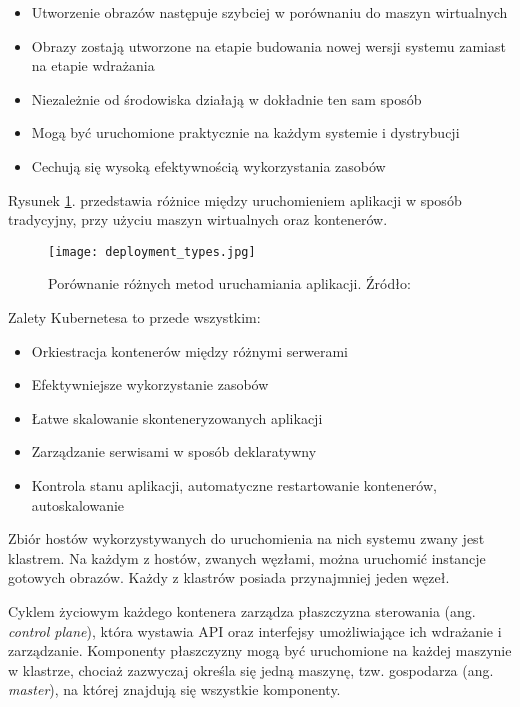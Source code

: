 \begin{itemize} %
    \item Utworzenie obrazów następuje szybciej w porównaniu do maszyn wirtualnych
    \item Obrazy zostają utworzone na etapie budowania nowej wersji systemu zamiast na etapie wdrażania
    \item Niezależnie od środowiska działają w dokładnie ten sam sposób
    \item Mogą być uruchomione praktycznie na każdym systemie i dystrybucji
    \item Cechują się wysoką efektywnością wykorzystania zasobów
\end{itemize}

Rysunek \ref{fig:deployment-types}. przedstawia różnice między uruchomieniem aplikacji w sposób 
tradycyjny, przy użyciu maszyn wirtualnych oraz kontenerów.

\begin{figure}[h]
    \centering
    \texttt{[image: deployment\_types.jpg]}
    \caption{Porównanie różnych metod uruchamiania aplikacji. Źródło: \cite{kubernetes2022}}
    \label{fig:deployment-types}
\end{figure}

Zalety Kubernetesa to przede wszystkim:

\begin{itemize} %
    \item Orkiestracja kontenerów między różnymi serwerami
    \item Efektywniejsze wykorzystanie zasobów
    \item Łatwe skalowanie skonteneryzowanych aplikacji 
    \item Zarządzanie serwisami w sposób deklaratywny
    \item Kontrola stanu aplikacji, automatyczne restartowanie kontenerów, 
    autoskalowanie
\end{itemize}

Zbiór hostów wykorzystywanych do uruchomienia na nich systemu zwany jest klastrem. Na 
każdym z hostów, zwanych węzłami, można uruchomić instancje gotowych obrazów. Każdy 
z klastrów posiada przynajmniej jeden węzeł.

Cyklem życiowym każdego kontenera zarządza płaszczyzna sterowania (ang. \textit{control 
plane}), która wystawia API oraz interfejsy umożliwiające ich wdrażanie i zarządzanie. 
Komponenty płaszczyzny mogą być uruchomione na każdej maszynie w klastrze, chociaż 
zazwyczaj określa się jedną maszynę, tzw. gospodarza (ang. \textit{master}), na której znajdują się 
wszystkie komponenty.

